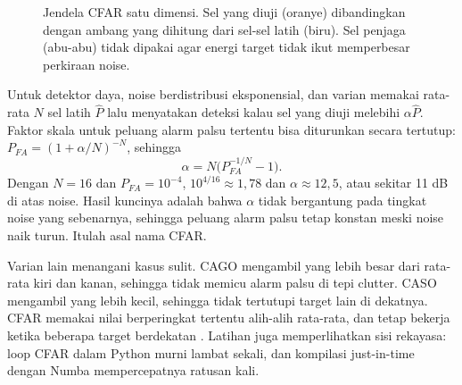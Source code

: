 \begin{figure}[ht]
\centering
{}
\caption{Jendela CFAR satu dimensi. Sel yang diuji (oranye) dibandingkan dengan ambang yang dihitung dari
sel-sel latih (biru). Sel penjaga (abu-abu) tidak dipakai agar energi target tidak ikut memperbesar
perkiraan noise.}
\label{fig:cfar}
\end{figure}

Untuk detektor daya, noise berdistribusi eksponensial, dan varian  memakai rata-rata
$N$ sel latih $\hat P$ lalu menyatakan deteksi kalau sel yang diuji melebihi $\alpha\hat P$. Faktor skala
untuk peluang alarm palsu tertentu bisa diturunkan secara tertutup: $P_{FA}=(1+\alpha/N)^{-N}$, sehingga
\begin{equation}
\alpha=N\big(P_{FA}^{-1/N}-1\big).
\end{equation}
Dengan $N=16$ dan $P_{FA}=10^{-4}$, $10^{4/16}\approx1{,}78$ dan $\alpha\approx12{,}5$, atau sekitar 11 dB di
atas noise. Hasil kuncinya adalah bahwa $\alpha$ tidak bergantung pada tingkat noise yang sebenarnya, sehingga
peluang alarm palsu tetap konstan meski noise naik turun. Itulah asal nama CFAR.

Varian lain menangani kasus sulit. CAGO mengambil yang lebih besar dari rata-rata kiri dan kanan, sehingga
tidak memicu alarm palsu di tepi clutter. CASO mengambil yang lebih kecil, sehingga tidak tertutupi target
lain di dekatnya.  CFAR memakai nilai berperingkat tertentu alih-alih rata-rata, dan
tetap bekerja ketika beberapa target berdekatan \citep{rohling1983}. Latihan juga memperlihatkan sisi rekayasa:
loop CFAR dalam Python murni lambat sekali, dan kompilasi just-in-time dengan Numba mempercepatnya ratusan kali.

